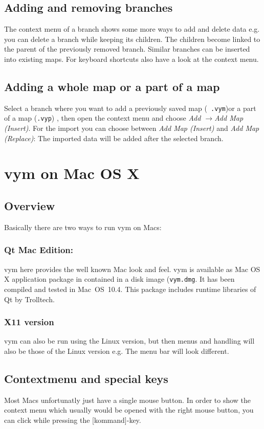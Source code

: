 \documentclass[12pt,a4paper]{article}
\newcommand{\vym}{{\sc vym }}
\newcommand{\ra}{$\longrightarrow$}
\newcommand{\key}[1]{[#1]}
\begin{document}
\subsection{Adding and removing branches}
The context menu of a branch shows some more ways to add and delete data
e.g. you can delete a branch while keeping its children. The children become
linked to the parent of the previously removed branch.
Similar branches can be inserted into existing maps. For keyboard
shortcuts also have a look at the context menu.

\subsection{Adding a whole map or a part of a map}
Select a branch where you want to add a previously saved map ({\tt
.vym})or a part of a map ({\tt .vyp}) , then open the context menu and
choose {\em Add \ra Add Map (Insert)}. For the import you can choose
between {\em Add Map (Insert)} and {\em Add Map (Replace)}: The imported
data will be added after the selected branch.


\section{\vym on Mac OS X}
\subsection{Overview}
Basically there are two ways to run \vym on Macs:
\subsubsection*{Qt Mac Edition:}
	\vym here provides the well known Mac look and feel.  \vym is
	available as Mac OS X application package in contained in a disk
	image ({\tt vym.dmg}. It has been compiled and tested in
	Mac~OS~10.4.  This package includes  runtime libraries of Qt by
	Trolltech.
	
\subsubsection*{X11 version} \vym can also be run using the Linux
version, but then menus and handling will also be those of the Linux
version e.g. The menu bar will look different. 

\subsection	{Contextmenu and special keys}
Most Macs unfortunatly just have a single mouse button. In order to show
the context menu which usually would be opened with the right mouse
button, you can click while pressing the \key{kommand}-key.
\end{document}
